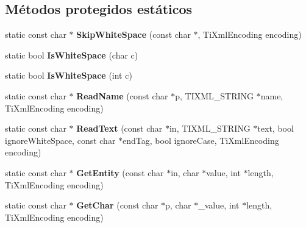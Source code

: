 \subsection*{Métodos protegidos estáticos}
\begin{DoxyCompactItemize}
\item 
\hypertarget{class_ti_xml_base_ac0c3d66d8a9e6996a1fa016275e16875}{static const char $\ast$ {\bfseries Skip\-White\-Space} (const char $\ast$, Ti\-Xml\-Encoding encoding)}\label{class_ti_xml_base_ac0c3d66d8a9e6996a1fa016275e16875}

\item 
\hypertarget{class_ti_xml_base_af56296d561c0bab4bc8e198cdcf5c48e}{static bool {\bfseries Is\-White\-Space} (char c)}\label{class_ti_xml_base_af56296d561c0bab4bc8e198cdcf5c48e}

\item 
\hypertarget{class_ti_xml_base_a3de391ea9f4c4a8aa10d04480b048795}{static bool {\bfseries Is\-White\-Space} (int c)}\label{class_ti_xml_base_a3de391ea9f4c4a8aa10d04480b048795}

\item 
\hypertarget{class_ti_xml_base_a1c21a6ab5f7b503acd91f35f183734b3}{static const char $\ast$ {\bfseries Read\-Name} (const char $\ast$p, T\-I\-X\-M\-L\-\_\-\-S\-T\-R\-I\-N\-G $\ast$name, Ti\-Xml\-Encoding encoding)}\label{class_ti_xml_base_a1c21a6ab5f7b503acd91f35f183734b3}

\item 
\hypertarget{class_ti_xml_base_aa646c74921aa33156968b802bbf5566e}{static const char $\ast$ {\bfseries Read\-Text} (const char $\ast$in, T\-I\-X\-M\-L\-\_\-\-S\-T\-R\-I\-N\-G $\ast$text, bool ignore\-White\-Space, const char $\ast$end\-Tag, bool ignore\-Case, Ti\-Xml\-Encoding encoding)}\label{class_ti_xml_base_aa646c74921aa33156968b802bbf5566e}

\item 
\hypertarget{class_ti_xml_base_ac5c08bf3deffcda0bf8ce2958372b584}{static const char $\ast$ {\bfseries Get\-Entity} (const char $\ast$in, char $\ast$value, int $\ast$length, Ti\-Xml\-Encoding encoding)}\label{class_ti_xml_base_ac5c08bf3deffcda0bf8ce2958372b584}

\item 
\hypertarget{class_ti_xml_base_a5b0fde72d6f662ae1fd6303195d2159b}{static const char $\ast$ {\bfseries Get\-Char} (const char $\ast$p, char $\ast$\-\_\-value, int $\ast$length, Ti\-Xml\-Encoding encoding)}\label{class_ti_xml_base_a5b0fde72d6f662ae1fd6303195d2159b}


\end{DoxyCompactItemize}
